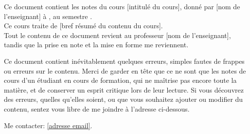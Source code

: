Ce document contient les notes du cours [intitulé du cours], donné par [nom de l'enseignant] à \faculty, au semestre \term. \\
Ce cours traite de [bref résumé du contenu du cours]. \\
Tout le contenu de ce document revient au professeur [nom de l'enseignant], tandis que la prise en note et la mise en forme me reviennent.
\begin{remark}
    Ce document contient inévitablement quelques erreurs, simples
    fautes de frappes ou erreurs sur le contenu. Merci de garder en tête que ce ne sont que les notes de cours d'un étudiant en cours de formation, qui ne maîtrise pas encore toute la matière, et de conserver un esprit critique lors de leur lecture. Si vous découvrez des erreurs, quelles qu'elles soient, ou que vous souhaitez ajouter ou modifier du contenu, sentez vous libre de me joindre à l'adresse ci-dessous.
\end{remark}
Me contacter:
\href{mailto:[adresse email]}{[adresse email]}.